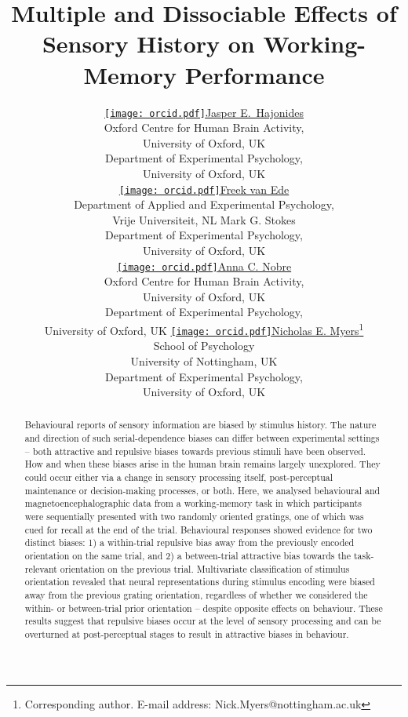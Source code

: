 \documentclass{article}
\title{Multiple and Dissociable Effects of Sensory History on Working-Memory Performance}
\author{ \href{https://orcid.org/0000-0002-0812-6842}{\texttt{[image: orcid.pdf]}\hspace{1mm}Jasper  E.~Hajonides} \\
	Oxford Centre for Human Brain Activity, \\
	University of Oxford, UK\\
	Department of Experimental Psychology, \\
	University of Oxford, UK \\
	\And
	\href{https://orcid.org/0000-0002-7434-1751}{\texttt{[image: orcid.pdf]}\hspace{1mm}Freek van Ede} \\
	Department of Applied and Experimental Psychology,\\
	Vrije Universiteit, NL
	\AND
	Mark G. Stokes \\
	Department of Experimental Psychology, \\
	University of Oxford, UK \\
	\And
	\href{https://orcid.org/0000-0001-5762-2802}{\texttt{[image: orcid.pdf]}\hspace{1mm}Anna C. Nobre} \\
	Oxford Centre for Human Brain Activity, \\
	University of Oxford, UK\\
	Department of Experimental Psychology, \\
	University of Oxford, UK
	\And
	\href{https://orcid.org/0000-0001-5599-3044}{\texttt{[image: orcid.pdf]}\hspace{1mm}Nicholas E. Myers}\thanks{Corresponding author. E-mail address: Nick.Myers@nottingham.ac.uk} \\
	School of Psychology \\
	University of Nottingham, UK \\ 
	Department of Experimental Psychology, \\
	University of Oxford, UK
}
\begin{document}
\maketitle

\begin{abstract}
Behavioural reports of sensory information are biased by stimulus history. The nature and direction of such serial-dependence biases can differ between experimental settings – both attractive and repulsive biases towards previous stimuli have been observed. How and when these biases arise in the human brain remains largely unexplored. They could occur either via a change in sensory processing itself, post-perceptual maintenance or decision-making processes, or both. Here, we analysed behavioural and magnetoencephalographic data from a working-memory task in which participants were sequentially presented with two randomly oriented gratings, one of which was cued for recall at the end of the trial. Behavioural responses showed evidence for two distinct biases: 1) a within-trial repulsive bias away from the previously encoded orientation on the same trial, and 2) a between-trial attractive bias towards the task-relevant orientation on the previous trial. Multivariate classification of stimulus orientation revealed that neural representations during stimulus encoding were biased away from the previous grating orientation, regardless of whether we considered the within- or between-trial prior orientation – despite opposite effects on behaviour. These results suggest that repulsive biases occur at the level of sensory processing and can be overturned at post-perceptual stages to result in attractive biases in behaviour.
\end{abstract}
%
%
\end{document}
